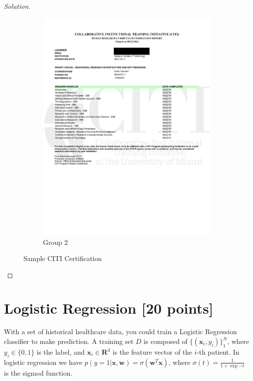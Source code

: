 \documentclass[12pt]{article}
\newenvironment{solution}
  {\begin{proof}[Solution]}
  {\end{proof}}
\begin{document}
\begin{solution}
\begin{figure}[h]
\begin{subfigure}[b]{0.5\textwidth}
\includegraphics[trim=0 200 0 0,width=\textwidth]{group2.pdf}
\caption{Group 2}
\end{subfigure}
\caption{Sample CITI Certification}
\end{figure}
\label{fig:certification}
\end{solution}



\section{Logistic Regression [20 points]}
With a set of historical healthcare data, you could train a Logistic Regression classifier to make prediction. A training set $D$ is composed of $\{(\mathbf{x}_i, y_i)\}_1^N$, where $y_i \in \{0, 1\}$ is the label, and $\mathbf{x}_i\in\mathbf{R}^d$ is the feature vector of the $i$-th patient. In logistic regression we have $p(y = 1 | \mathbf{x}, \mathbf{w}) = \sigma(\mathbf{w}^T\mathbf{x})$, where $\sigma(t) = \frac{1}{1 + \exp{-t}}$ is the sigmod function. 
\end{document}
